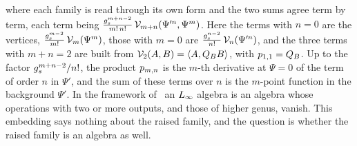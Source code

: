 where each family is read through its own form and the two sums agree term by term, each term being $\tfrac{g_s^{m+n-2}}{m! \, n!} \, \mathcal{V}_{m+n}(\Psi'^n, \Psi^m)$.
Here the terms with $n = 0$ are the vertices, $\tfrac{g_s^{m-2}}{m!} \, \mathcal{V}_{m}(\Psi^m)$, those with $m = 0$ are $\tfrac{g_s^{n-2}}{n!} \, \mathcal{V}_{n}(\Psi'^n)$, and the three terms with $m + n = 2$ are built from $\mathcal{V}_{2}(A, B) = \braket{A, Q_B B}_{}$, with $p_{1,1} = Q_B$.
Up to the factor $g_s^{m+n-2} / n!$, the product $p_{m,n}$ is the $m$-th derivative at $\Psi = 0$ of the term of order $n$ in $\Psi'$, and the sum of these terms over $n$ is the $m$-point function in the background $\Psi'$.
In the framework of~\cite{Cieliebak:2015:HomologicalAlgebraRelated} an $L_\infty$ algebra is an \IBL{} algebra whose operations with two or more outputs, and those of higher genus, vanish.
This embedding says nothing about the raised family, and the question is whether the raised family is an \IBL{} algebra as well.

